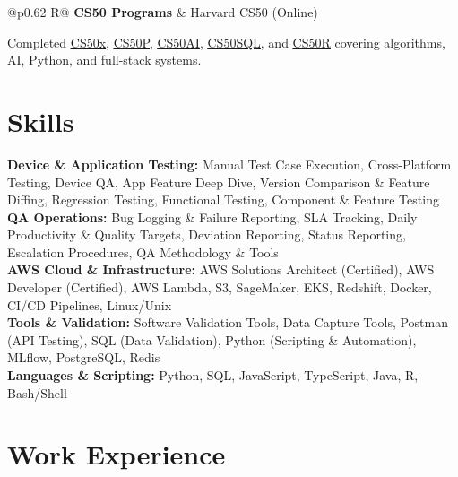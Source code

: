 \documentclass[a4paper,10pt]{article}
\newcommand{\ulink}[2]{\href{#1}{\uline{#2}}}
\newcommand{\subheading}[1]{{\color[HTML]{0A0A0A}\fontsize{12}{14}\selectfont\bfseries #1}}
\newcommand{\meta}[1]{{\color[HTML]{5C5C5C}\fontsize{10.5}{12.5}\selectfont #1}}
\begin{document}
\begin{tabularx}{\linewidth}{@{}p{0.62\linewidth} R@{}}
\subheading{CS50 Programs} & \meta{Harvard CS50 (Online)}
\end{tabularx}
\vspace{1pt}
{\color[HTML]{3A3A3A}\fontsize{11}{14}\selectfont Completed \ulink{https://cs50.harvard.edu/certificates/b14b78df-e05c-413e-a607-1dd27303053a}{CS50x}, \ulink{https://cs50.harvard.edu/certificates/32477052-9db4-49c4-a5a4-d7e58429ca2c}{CS50P}, \ulink{https://cs50.harvard.edu/certificates/9cdb4d4a-1250-4f8e-9fd7-191864e0f919}{CS50AI}, \ulink{https://cs50.harvard.edu/certificates/bc486f24-f085-4e61-8536-80940b97a1b9}{CS50SQL}, and \ulink{https://cs50.harvard.edu/certificates/666838e6-a053-4d82-b179-a60fe745fd84}{CS50R} covering algorithms, AI, Python, and full-stack systems.}

\vspace{2pt}

\section{Skills}
\vspace{5pt}
{\color[HTML]{0A0A0A}\fontsize{11}{14}\selectfont
\textbf{Device \& Application Testing:} Manual Test Case Execution, Cross-Platform Testing, Device QA, App Feature Deep Dive, Version Comparison \& Feature Diffing, Regression Testing, Functional Testing, Component \& Feature Testing \\[2pt]
\textbf{QA Operations:} Bug Logging \& Failure Reporting, SLA Tracking, Daily Productivity \& Quality Targets, Deviation Reporting, Status Reporting, Escalation Procedures, QA Methodology \& Tools \\[2pt]
\textbf{AWS Cloud \& Infrastructure:} AWS Solutions Architect (Certified), AWS Developer (Certified), AWS Lambda, S3, SageMaker, EKS, Redshift, Docker, CI/CD Pipelines, Linux/Unix \\[2pt]
\textbf{Tools \& Validation:} Software Validation Tools, Data Capture Tools, Postman (API Testing), SQL (Data Validation), Python (Scripting \& Automation), MLflow, PostgreSQL, Redis \\[2pt]
\textbf{Languages \& Scripting:} Python, SQL, JavaScript, TypeScript, Java, R, Bash/Shell}

\vspace{2pt}

\section{Work Experience}
\vspace{2pt}
\end{document}
